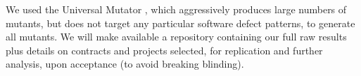 We used the Universal Mutator \cite{universalmutator,regexpMut}, which aggressively produces large numbers of mutants, but does not target any particular software defect patterns, to generate all mutants.  We will make available a repository containing our full raw results plus details on contracts and projects selected, for replication and further analysis, upon acceptance (to avoid breaking blinding).
